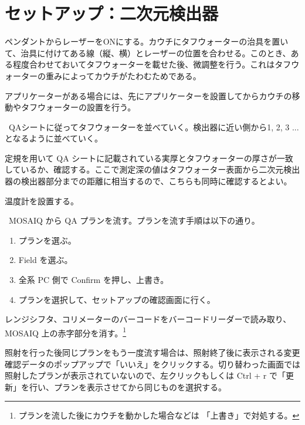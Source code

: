\documentclass[11pt,a4paper]{jsarticle}
\newcommand{\noindot}{\noindent{$\cdot$}} %
\begin{document}
\section{セットアップ：二次元検出器}
\noindot ペンダントからレーザーをONにする。カウチにタフウォーターの治具を置いて、治具に付けてある線（縦、横）とレーザーの位置を合わせる。このとき、ある程度合わせておいてタフウォーターを載せた後、微調整を行う。これはタフウォーターの重みによってカウチがたわむためである。\par
\noindot アプリケーターがある場合には、先にアプリケーターを設置してからカウチの移動やタフウォーターの設置を行う。\par
\noindot ~QAシートに従ってタフウォーターを並べていく。検出器に近い側から1, 2, 3 ... となるように並べていく。\par
\noindot 定規を用いて QA シートに記載されている実厚とタフウォーターの厚さが一致しているか、確認する。ここで測定深の値はタフウォーター表面から二次元検出器の検出器部分までの距離に相当するので、こちらも同時に確認するとよい。\par
\noindot 温度計を設置する。\par
\noindot ~MOSAIQ から QA プランを流す。プランを流す手順は以下の通り。
	\begin{enumerate}
		\item プランを選ぶ。
		\item Field を選ぶ。
		\item 全系 PC 側で Confirm を押し、上書き。
		\item プランを選択して、セットアップの確認画面に行く。
	\end{enumerate}%
\noindot レンジシフタ、コリメーターのバーコードをバーコードリーダーで読み取り、MOSAIQ 上の赤字部分を消す。\footnote{プランを流した後にカウチを動かした場合などは 「上書き」で対処する。}\par
\noindot 照射を行った後同じプランをもう一度流す場合は、照射終了後に表示される変更確認データのポップアップで「いいえ」をクリックする。切り替わった画面では照射したプランが表示されていないので、左クリックもしくは Ctrl + r で「更新」を行い、プランを表示させてから同じものを選択する。
%
\end{document}
